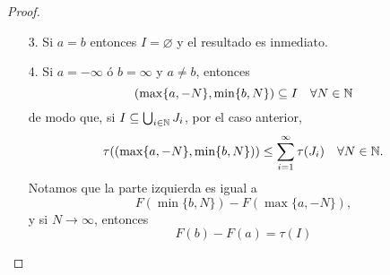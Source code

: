 \begin{proof}
\begin{enumerate}
		\item[3.] Si $a=b$ entonces $I = \varnothing$ y el resultado es inmediato.

		\item[4.] Si $a = -\infty$ ó $b = \infty$ y $a\neq b$, entonces
		\[ ( \max \{a,-N\}, \min \{b,N\} ) \subseteq I \quad \forall N \in \mathbb{N} \]
		de modo que, si $I \subseteq \bigcup_{i\in\mathbb{N}} J_i$, por el caso anterior,
		\[ \tau((\max \{a,-N\}, \min \{b,N\})) \leq \sum_{i=1}^{\infty} \tau(J_i) \quad \forall N \in \mathbb{N}. \]
		Notamos que la parte izquierda es igual a
		\[ F( \min \{b,N\} ) - F( \max \{a,-N\} ), \]
		y si $N \longrightarrow \infty$, entonces
		\[ F(b) - F(a) = \tau(I) \]
	\end{enumerate}
\end{proof}
